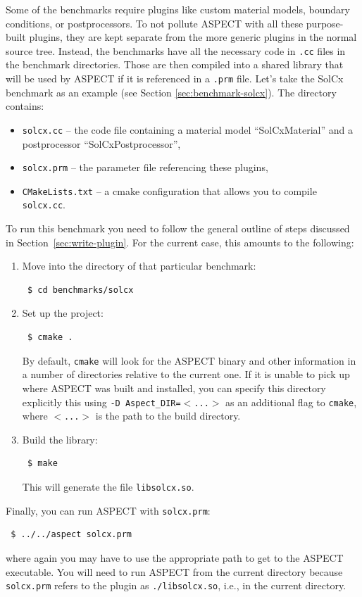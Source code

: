 \documentclass{article}
\newcommand{\aspect}{\textsc{ASPECT}}
\begin{document}
Some of the benchmarks require plugins like custom material models, boundary
conditions, or postprocessors. To not pollute \aspect{} with all these
purpose-built plugins, they are kept separate from the more generic plugins in
the normal source tree. Instead, the benchmarks have all the necessary code in
\texttt{.cc} files in the benchmark directories. Those are then compiled into a shared
library that will be used by \aspect{} if it is referenced in a \texttt{.prm}
file. Let's take the SolCx benchmark as an example (see Section \ref{sec:benchmark-solcx}).
The directory contains:
\begin{itemize}
 \item \texttt{solcx.cc} -- the code file containing a material model
   ``SolCxMaterial'' and a postprocessor ``SolCxPostprocessor'',
 \item \texttt{solcx.prm} -- the parameter file referencing these plugins,
 \item \texttt{CMakeLists.txt} -- a cmake configuration that allows you to
   compile \texttt{solcx.cc}.
\end{itemize}
To run this benchmark you need to follow the general outline of
steps discussed in Section~\ref{sec:write-plugin}. For the current case, this
amounts to the following:
\begin{enumerate}
 \item Move into the directory of that particular benchmark:
\begin{verbatim}
 $ cd benchmarks/solcx
\end{verbatim}
 \item Set up the project:
\begin{verbatim}
 $ cmake .
\end{verbatim}
 By default, \texttt{cmake} will look for the \aspect{} binary and other
 information in a number of directories relative to the current one.
 If it is unable to pick up where \aspect{} was built and installed, you can
 specify this directory explicitly this using \texttt{-D
   Aspect\_DIR=$<$...$>$} as an additional flag to \texttt{cmake}, where
 \texttt{$<$...$>$} is the path to the build directory.
 \item Build the library:
\begin{verbatim}
 $ make
\end{verbatim}
 This will generate the file \texttt{libsolcx.so}.
\end{enumerate}
Finally, you can run \aspect{} with \texttt{solcx.prm}:
\begin{verbatim}
 $ ../../aspect solcx.prm
\end{verbatim}
where again you may have to use the appropriate path to get to the \aspect{}
executable. You will need to run \aspect{} from the current directory because
\texttt{solcx.prm} refers to the plugin as \texttt{./libsolcx.so}, i.e., in
the current directory.
\end{document}
